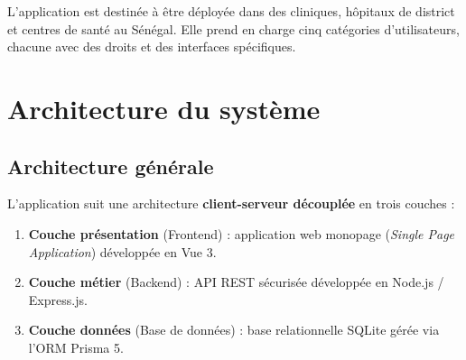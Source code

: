 \documentclass[12pt, a4paper]{report}
\begin{document}
L'application est destinée à être déployée dans des cliniques, hôpitaux de
district et centres de santé au Sénégal. Elle prend en charge cinq catégories
d'utilisateurs, chacune avec des droits et des interfaces spécifiques.

\chapter{Architecture du système}

\section{Architecture générale}

L'application suit une architecture \textbf{client-serveur découplée} en trois
couches :

\begin{enumerate}
  \item \textbf{Couche présentation} (Frontend) : application web monopage
        (\textit{Single Page Application}) développée en Vue 3.
  \item \textbf{Couche métier} (Backend) : API REST sécurisée développée en
        Node.js / Express.js.
  \item \textbf{Couche données} (Base de données) : base relationnelle SQLite
        gérée via l'ORM Prisma 5.
\end{enumerate}

\medskip

\begin{center}
\end{center}
\end{document}

